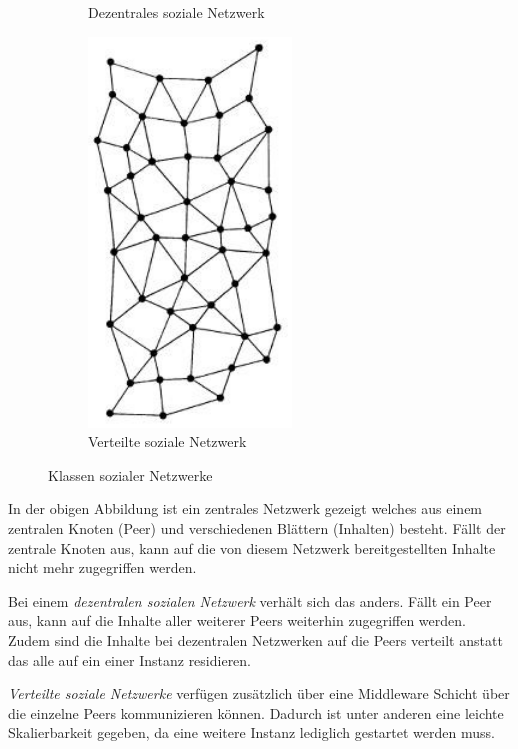 \begin{figure}[!t]
\begin{subfigure}[t]{0.4\linewidth}
			\caption{Dezentrales soziale Netzwerk}
			\label{fig:decentral-network}
		\end{subfigure}
		\begin{subfigure}[t]{0.4\linewidth}
			\centering
			\includegraphics[width=0.4\linewidth]{figures/distributed-network.png}
			\caption{Verteilte soziale Netzwerk}
			\label{fig:distributed-network}
		\end{subfigure}
		\vspace{4pt}
		\caption{Klassen sozialer Netzwerke}
	\end{figure}\par

	In der obigen Abbildung ist ein zentrales Netzwerk gezeigt welches aus einem zentralen Knoten (Peer) und verschiedenen Blättern (Inhalten) besteht. Fällt der zentrale Knoten aus, kann auf die von diesem Netzwerk bereitgestellten Inhalte nicht mehr zugegriffen werden.\par
	
	Bei einem \textit{dezentralen sozialen Netzwerk} verhält sich das anders. Fällt ein Peer aus, kann auf die Inhalte aller weiterer Peers weiterhin zugegriffen werden. Zudem sind die Inhalte bei dezentralen Netzwerken auf die Peers verteilt anstatt das alle auf ein einer Instanz residieren.\par
	
	\textit{Verteilte soziale Netzwerke} verfügen zusätzlich über eine Middleware Schicht über die einzelne Peers kommunizieren können. Dadurch ist unter anderen eine leichte Skalierbarkeit gegeben, da eine weitere Instanz lediglich gestartet werden muss.\par
	
